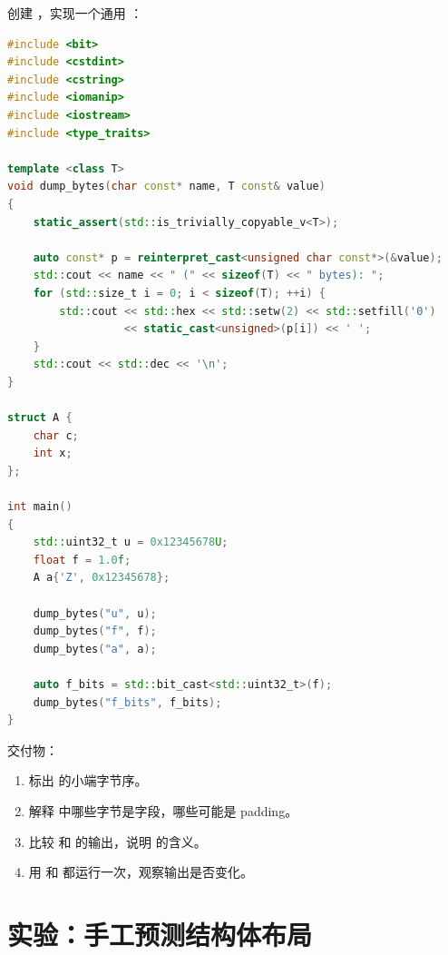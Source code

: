 \begin{labbox}
创建 ，实现一个通用 ：

\begin{lstlisting}[language=C++]
#include <bit>
#include <cstdint>
#include <cstring>
#include <iomanip>
#include <iostream>
#include <type_traits>

template <class T>
void dump_bytes(char const* name, T const& value)
{
    static_assert(std::is_trivially_copyable_v<T>);

    auto const* p = reinterpret_cast<unsigned char const*>(&value);
    std::cout << name << " (" << sizeof(T) << " bytes): ";
    for (std::size_t i = 0; i < sizeof(T); ++i) {
        std::cout << std::hex << std::setw(2) << std::setfill('0')
                  << static_cast<unsigned>(p[i]) << ' ';
    }
    std::cout << std::dec << '\n';
}

struct A {
    char c;
    int x;
};

int main()
{
    std::uint32_t u = 0x12345678U;
    float f = 1.0f;
    A a{'Z', 0x12345678};

    dump_bytes("u", u);
    dump_bytes("f", f);
    dump_bytes("a", a);

    auto f_bits = std::bit_cast<std::uint32_t>(f);
    dump_bytes("f_bits", f_bits);
}
\end{lstlisting}

交付物：

\begin{enumerate}
  \item 标出  的小端字节序。
  \item 解释  中哪些字节是字段，哪些可能是 padding。
  \item 比较  和  的输出，说明  的含义。
  \item 用  和  都运行一次，观察输出是否变化。
\end{enumerate}
\end{labbox}

\section{实验：手工预测结构体布局}

